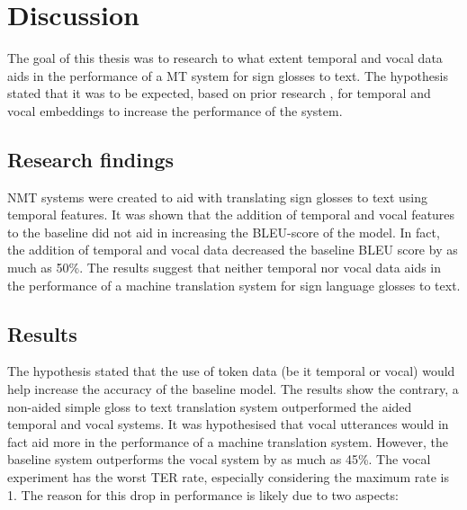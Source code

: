 \break
\section{Discussion}

The goal of this thesis was to research to what extent temporal and vocal data aids in the performance of a MT system for sign glosses to text. The hypothesis stated that it was to be expected, based on prior research \cite{konradoffentliches}, for temporal and vocal embeddings to increase the performance of the system.



\subsection{Research findings}

NMT systems were created to aid with translating sign glosses to text using temporal features. It was shown that the addition of temporal and vocal features to the baseline did not aid in increasing the BLEU-score of the model. In fact, the addition of temporal and vocal data decreased the baseline BLEU score by as much as 50\%. The results suggest that neither temporal nor vocal data aids in the performance of a machine translation system for sign language glosses to text.

\subsection{Results}

The hypothesis stated that the use of token data (be it temporal or vocal) would help increase the accuracy of the baseline model. The results show the contrary, a non-aided simple gloss to text translation system outperformed the aided temporal and vocal systems. It was hypothesised that vocal utterances would in fact aid more in the performance of a machine translation system. However, the baseline system outperforms the vocal system by as much as 45\%. The vocal experiment has the worst TER rate, especially considering the maximum rate is 1. The reason for this drop in performance is likely due to two aspects: 

